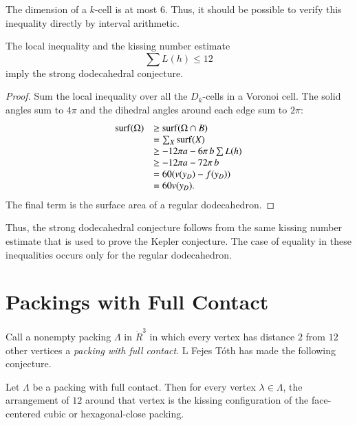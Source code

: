 \begin{note} %
The dimension of a $k$-cell is at most $6$.  Thus, it should be possible to verify this inequality directly by interval arithmetic.
\end{note}

\begin{lemma}  The local inequality and the kissing number estimate
$$
\sum L(h) \le 12
$$
imply the strong dodecahedral conjecture.
\end{lemma}

\begin{proof} 
Sum the local inequality over all the $D_k$-cells in a Voronoi cell.  The solid angles sum to $4\pi$ and the dihedral angles around each edge sum to $2\pi$:
$$
\begin{array}{lll}
{\operatorname{surf}}(\Omega) &\ge {\operatorname{surf}}(\Omega\cap B)\\
&=\sum_X {\operatorname{surf}}(X)\\
&\ge -12\pi a - 6\pi\, b  \sum L(h)\\
&\ge -12\pi a - 72\pi\, b\\
&= 60 (v(y_D) - f(y_D))\\
&= 60 v(y_D).\\
\end{array}
$$
The final term is the surface area of a regular dodecahedron.
\end{proof}

Thus, the strong dodecahedral conjecture follows from the same kissing number estimate that is used to prove the Kepler conjecture.  The case of equality in these inequalities occurs only for the regular dodecahedron.

\section{Packings with Full Contact}



Call a nonempty packing $\Lambda$ in $\ring{R}^3$ in which every vertex has distance $2$ from  $12$ other vertices a {\it packing with full contact}. L Fejes T\'oth has made the following conjecture.

\begin{conjecture}  Let $\Lambda$ be a packing with full contact.  Then for every vertex $\lambda\in\Lambda$, the arrangement of $12$ around that vertex is the kissing configuration of the face-centered cubic or hexagonal-close packing. 
\end{conjecture}


